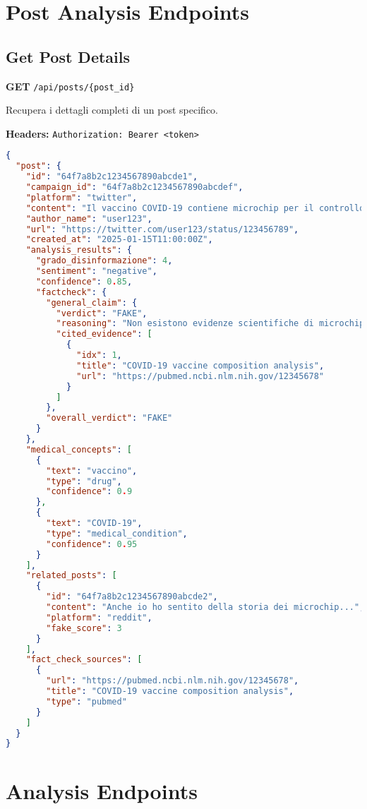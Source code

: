 \documentclass[12pt,a4paper]{report}
\begin{document}
\section{Post Analysis Endpoints}

\subsection{Get Post Details}

\textbf{GET} \texttt{/api/posts/\{post\_id\}}

Recupera i dettagli completi di un post specifico.

\textbf{Headers:} \texttt{Authorization: Bearer <token>}

\begin{lstlisting}[language=json, caption=Response (200 OK)]
{
  "post": {
    "id": "64f7a8b2c1234567890abcde1",
    "campaign_id": "64f7a8b2c1234567890abcdef",
    "platform": "twitter",
    "content": "Il vaccino COVID-19 contiene microchip per il controllo mentale...",
    "author_name": "user123",
    "url": "https://twitter.com/user123/status/123456789",
    "created_at": "2025-01-15T11:00:00Z",
    "analysis_results": {
      "grado_disinformazione": 4,
      "sentiment": "negative",
      "confidence": 0.85,
      "factcheck": {
        "general_claim": {
          "verdict": "FAKE",
          "reasoning": "Non esistono evidenze scientifiche di microchip nei vaccini COVID-19",
          "cited_evidence": [
            {
              "idx": 1,
              "title": "COVID-19 vaccine composition analysis",
              "url": "https://pubmed.ncbi.nlm.nih.gov/12345678"
            }
          ]
        },
        "overall_verdict": "FAKE"
      }
    },
    "medical_concepts": [
      {
        "text": "vaccino",
        "type": "drug",
        "confidence": 0.9
      },
      {
        "text": "COVID-19",
        "type": "medical_condition",
        "confidence": 0.95
      }
    ],
    "related_posts": [
      {
        "id": "64f7a8b2c1234567890abcde2",
        "content": "Anche io ho sentito della storia dei microchip...",
        "platform": "reddit",
        "fake_score": 3
      }
    ],
    "fact_check_sources": [
      {
        "url": "https://pubmed.ncbi.nlm.nih.gov/12345678",
        "title": "COVID-19 vaccine composition analysis",
        "type": "pubmed"
      }
    ]
  }
}
\end{lstlisting}

\section{Analysis Endpoints}
\end{document}
